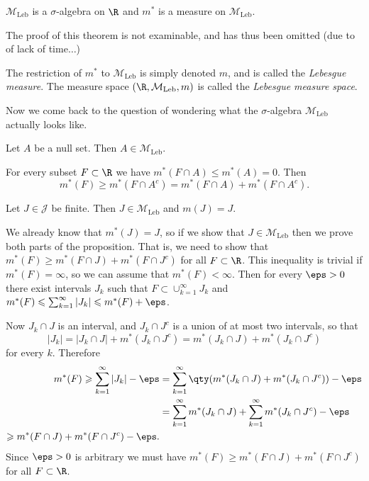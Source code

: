 \documentclass{maths}
\newcommand{\mleb}{\mathcal{M}_{\text{Leb}}}
\newcommand{\intvl}{\mathcal{J}}
\begin{document}
\begin{thm}
    $\mleb$ is a $\sigma$-algebra on $\R$ and $m^*$ is a measure on $\mleb$.
\end{thm}

\begin{prf}
    The proof of this theorem is not examinable, and has thus been omitted (due to of lack of time$\ldots$)
\end{prf}

\begin{defn}
    The restriction of $m^*$ to $\mleb$ is simply denoted $m$, and is called the \emph{Lebesgue measure}.
    The measure space $(\R,\mleb,m)$ is called the \emph{Lebesgue measure space}.
\end{defn}

Now we come back to the question of wondering what the $\sigma$-algebra $\mleb$ actually looks like.

\begin{prop}
    Let $A$ be a null set.
    Then $A\in\mleb$.
\end{prop}

\begin{prf}
    For every subset $F\subset\R$ we have $m^*(F\cap A)\leqslant m^*(A)=0$.
    Then
    \[
        m^*(F) \geqslant
        m^*(F\cap A^c) =
        m^*(F\cap A) + m^*(F\cap A^c).
    \]
\end{prf}

\begin{prop}
    Let $J\in\intvl$ be finite.
    Then $J\in\mleb$ and $m(J)=J$.
\end{prop}

\begin{prf}
    We already know that $m^*(J)=J$, so if we show that $J\in\mleb$ then we prove both parts of the proposition.
    That is, we need to show that $m^*(F) \geqslant m^*(F\cap J) + m^*(F\cap J^c)$ for all $F\subset\R$.
    This inequality is trivial if $m^*(F)=\infty$, so we can assume that $m^*(F)<\infty$.
    Then for every $\eps>0$ there exist intervals $J_k$ such that $F\subset\cup_{k=1}^{\infty} J_k$ and $m^*(F)\leqslant\sum_{k=1}^{\infty} |J_k|\leqslant m^*(F) + \eps$.

    Now $J_k\cap J$ is an interval, and $J_k\cap J^c$ is a union of at most two intervals, so that
    \[
        |J_k| =
        |J_k\cap J| + m^*(J_k\cap J^c) =
        m^*(J_k\cap J) + m^*(J_k\cap J^c)
    \]
    for every $k$.
    Therefore
    \begin{align*}
        m^*(F) \geqslant
        \sum_{k=1}^{\infty} |J_k| - \eps
        &= \sum_{k=1}^{\infty} \qty(m^*(J_k\cap J) + m^*(J_k\cap J^c)) - \eps\\
        &= \sum_{k=1}^{\infty} m^*(J_k\cap J) + \sum_{k=1}^{\infty} m^*(J_k\cap J^c) - \eps\\
        \geqslant m^*(F\cap J) + m^*(F\cap J^c) - \eps.
    \end{align*}
    Since $\eps>0$ is arbitrary we must have $m^*(F) \geqslant m^*(F\cap J) + m^*(F\cap J^c)$ for all $F\subset\R$.
\end{prf}
\end{document}
